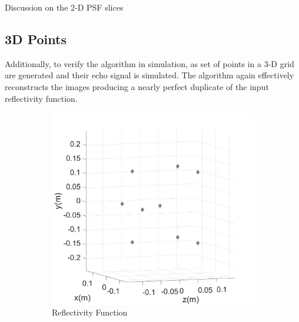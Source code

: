 \documentclass[conference]{IEEEtran}
\begin{document}
		Discussion on the 2-D PSF slices
		
		\subsection{3D Points}
		Additionally, to verify the algorithm in simulation, as set of points in a 3-D grid are generated and their echo signal is simulated. The algorithm again effectively reconstructs the images producing a nearly perfect duplicate of the input reflectivity function. 
		
		\begin{figure} [h]
			\begin{subfigure}{.5\linewidth}
				\centering
				\includegraphics[width=1\linewidth]{../MatlabResults/CSAR_Grid3D_input}
				\caption{Reflectivity Function}
				\label{fig:grid3D_in}
			\end{subfigure}%
			\begin{subfigure}{.5\linewidth}
				\label{fig:grid3D_out}
				\centering

\end{subfigure}
\end{figure}
\end{document}
